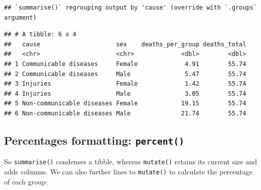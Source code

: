 \documentclass[
  12pt,
  krantz2]{krantz}
\makeatletter
\newenvironment{Shaded}{\begin{snugshade}}{\end{snugshade}}
\newcommand{\CommentTok}[1]{\textcolor[rgb]{0.56,0.35,0.01}{\textit{#1}}}
\newcommand{\DataTypeTok}[1]{\textcolor[rgb]{0.13,0.29,0.53}{#1}}
\newcommand{\KeywordTok}[1]{\textcolor[rgb]{0.13,0.29,0.53}{\textbf{#1}}}
\newcommand{\NormalTok}[1]{#1}
\newcommand{\OperatorTok}[1]{\textcolor[rgb]{0.81,0.36,0.00}{\textbf{#1}}}
\newcommand{\StringTok}[1]{\textcolor[rgb]{0.31,0.60,0.02}{#1}}
\newenvironment{kframe}{%
\medskip{}
\setlength{\fboxsep}{.8em}
 \def\at@end@of@kframe{}%
 \ifinner\ifhmode%
  \def\at@end@of@kframe{\end{minipage}}%
  \begin{minipage}{\columnwidth}%
 \fi\fi%
 \def\FrameCommand##1{\hskip\@totalleftmargin \hskip-\fboxsep
 \colorbox{shadecolor}{##1}\hskip-\fboxsep
     \hskip-\linewidth \hskip-\@totalleftmargin \hskip\columnwidth}%
 \MakeFramed {\advance\hsize-\width
   \@totalleftmargin\z@ \linewidth\hsize
   \@setminipage}}%
 {\par\unskip\endMakeFramed%
 \at@end@of@kframe}
\renewenvironment{Shaded}{\begin{kframe}}{\end{kframe}}
\makeatother
\begin{document}
\begin{verbatim}
## `summarise()` regrouping output by 'cause' (override with `.groups` argument)
\end{verbatim}

\begin{verbatim}
## # A tibble: 6 x 4
##   cause                     sex    deaths_per_group deaths_total
##   <chr>                     <chr>             <dbl>        <dbl>
## 1 Communicable diseases     Female             4.91        55.74
## 2 Communicable diseases     Male               5.47        55.74
## 3 Injuries                  Female             1.42        55.74
## 4 Injuries                  Male               3.05        55.74
## 5 Non-communicable diseases Female            19.15        55.74
## 6 Non-communicable diseases Male              21.74        55.74
\end{verbatim}

\hypertarget{percentages-formatting-percent}{%
\subsection{\texorpdfstring{Percentages formatting: \texttt{percent()}}{Percentages formatting: percent()}}\label{percentages-formatting-percent}}


So \texttt{summarise()} condenses a tibble, whereas \texttt{mutate()} retains its current size and adds columns.
We can also further lines to \texttt{mutate()} to calculate the percentage of each group:

\begin{Shaded}
\end{Shaded}
\end{document}

